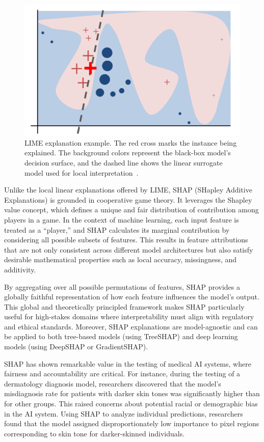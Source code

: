 \documentclass[manuscript,screen,review]{acmart}
\begin{document}
\begin{figure}[htbp]
  \centering
  \includegraphics[width=0.6\linewidth]{picture/5.2fig1.png}
  \caption{LIME explanation example. The red cross marks the instance being explained. The background colors represent the black-box model’s decision surface, and the dashed line shows the linear surrogate model used for local interpretation~\cite{Ribeiro2016}.}
  \label{fig:lime}
\end{figure}

Unlike the local linear explanations offered by LIME, SHAP (SHapley Additive Explanations) is grounded in cooperative game theory. It leverages the Shapley value concept, which defines a unique and fair distribution of contribution among players in a game. In the context of machine learning, each input feature is treated as a “player,” and SHAP calculates its marginal contribution by considering all possible subsets of features. This results in feature attributions that are not only consistent across different model architectures but also satisfy desirable mathematical properties such as local accuracy, missingness, and additivity.

By aggregating over all possible permutations of features, SHAP provides a globally faithful representation of how each feature influences the model’s output. This global and theoretically principled framework makes SHAP particularly useful for high-stakes domains where interpretability must align with regulatory and ethical standards. Moreover, SHAP explanations are model-agnostic and can be applied to both tree-based models (using TreeSHAP) and deep learning models (using DeepSHAP or GradientSHAP).

SHAP has shown remarkable value in the testing of medical AI systems, where fairness and accountability are critical. For instance, during the testing of a dermatology diagnosis model, researchers discovered that the model’s misdiagnosis rate for patients with darker skin tones was significantly higher than for other groups. This raised concerns about potential racial or demographic bias in the AI system. Using SHAP to analyze individual predictions, researchers found that the model assigned disproportionately low importance to pixel regions corresponding to skin tone for darker-skinned individuals.
\end{document}
